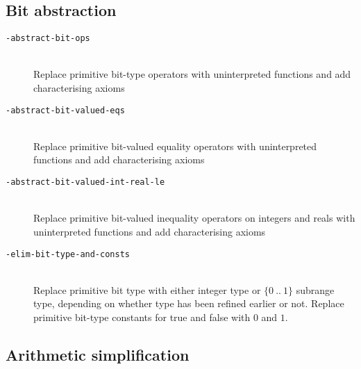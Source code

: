 \documentclass[12pt,fleqn]{article}
\newcommand{\subrange}[2]{\{{#1}\:..\:{#2}\}}
\newcommand{\optionb}[1]{\item[\texttt{-{#1}}]\ \\}
\begin{document}
\subsection{Bit abstraction}

\begin{description}
\optionb{abstract-bit-ops}
  Replace primitive bit-type operators with uninterpreted functions 
  and add characterising axioms

\optionb{abstract-bit-valued-eqs}
  Replace primitive bit-valued equality operators with uninterpreted functions 
  and add characterising axioms

  \optionb{abstract-bit-valued-int-real-le} 
  Replace primitive
  bit-valued inequality operators on integers and reals with
  uninterpreted functions and add characterising axioms

\optionb{elim-bit-type-and-consts}
  Replace primitive bit type with either integer type or $\subrange{0}{1}$ 
  subrange type, depending on whether type has been refined earlier or not.
  Replace primitive bit-type constants for true and false with $0$ and $1$.

\end{description}


\subsection{Arithmetic simplification}
\end{document}
